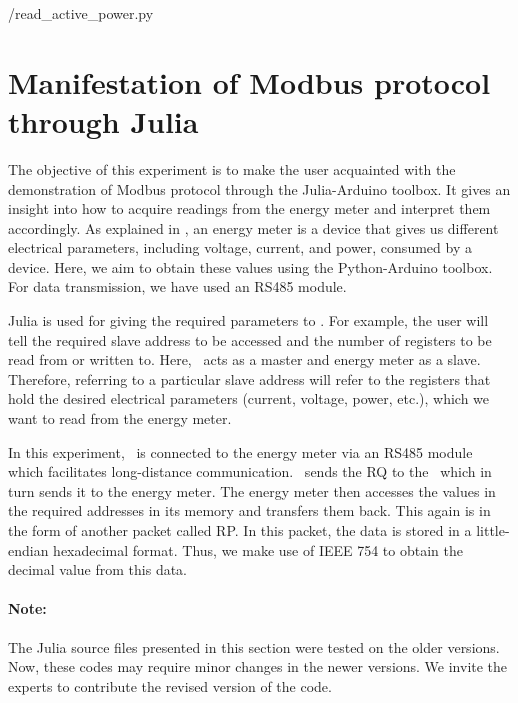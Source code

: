 \begin{pycode}
  \label{py:modbus-power}
  
  {\LocMODpycode/read_active_power.py}
\end{pycode}


\section{Manifestation of Modbus protocol through Julia}
The objective of this experiment is to make the user acquainted with
the demonstration of Modbus protocol through the Julia-Arduino toolbox. 
It gives an insight into how to acquire readings from the energy meter and interpret them accordingly. As explained in , 
an energy meter is a device that gives us different electrical parameters, including voltage, current, and power, consumed by a device. Here, we aim to obtain these values using the Python-Arduino toolbox. For data transmission, we have used an RS485 module.

Julia is used for giving the required parameters to \arduino. For
example, the user will tell the required slave address to be accessed
and the number of registers to be read from or written to. Here,
\arduino\ acts as a master and energy meter as a slave. Therefore,
referring to a particular slave address will refer to the registers
that hold the desired electrical parameters (current, voltage, power, etc.), which we want to read from the energy meter.

In this experiment, \arduino\ is connected to the energy meter via an RS485 module which facilitates long-distance communication. 
\scilab\ sends the RQ to the \arduino\, which in turn sends it to the
energy meter. The energy meter then accesses the values in the
required addresses in its memory and transfers them back. This again
is in the form of another packet called RP. In this packet, the data is stored in a little-endian hexadecimal format. Thus, we make use of IEEE 754 to obtain the decimal value from this data. 

\paragraph{Note: } The Julia source files presented in this section were tested on the older versions. Now, these codes may require minor changes in
the newer versions. We invite the experts to contribute the revised version of the code.


